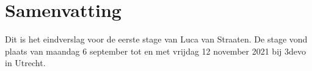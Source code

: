 \chapter{Samenvatting}
\label{Samenvatting}

\begin{center}
   \begin{minipage}{0.5\textwidth}
      \begin{small}
         Dit is het eindverslag voor de eerste stage van Luca van Straaten. De stage vond plaats van maandag 6 september tot en met vrijdag 12 november 2021 bij 3devo in Utrecht.
      \end{small}
   \end{minipage}
   \vspace{0.5cm}
\end{center}



